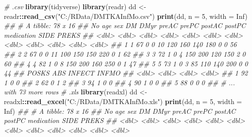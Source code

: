 \documentclass[
]{book}
\newenvironment{Shaded}{\begin{snugshade}}{\end{snugshade}}
\newcommand{\CommentTok}[1]{\textcolor[rgb]{0.56,0.35,0.01}{\textit{#1}}}
\newcommand{\DataTypeTok}[1]{\textcolor[rgb]{0.13,0.29,0.53}{#1}}
\newcommand{\DecValTok}[1]{\textcolor[rgb]{0.00,0.00,0.81}{#1}}
\newcommand{\KeywordTok}[1]{\textcolor[rgb]{0.13,0.29,0.53}{\textbf{#1}}}
\newcommand{\NormalTok}[1]{#1}
\newcommand{\OperatorTok}[1]{\textcolor[rgb]{0.81,0.36,0.00}{\textbf{#1}}}
\newcommand{\OtherTok}[1]{\textcolor[rgb]{0.56,0.35,0.01}{#1}}
\newcommand{\StringTok}[1]{\textcolor[rgb]{0.31,0.60,0.02}{#1}}
\begin{document}
\begin{Shaded}
\begin{Highlighting}[]
\CommentTok{\# .csv}
\KeywordTok{library}\NormalTok{(tidyverse)}
\KeywordTok{library}\NormalTok{(readr)}
\NormalTok{dd \textless{}{-}}\StringTok{ }\NormalTok{readr}\OperatorTok{::}\KeywordTok{read\_csv}\NormalTok{(}\StringTok{"C:/RData/DMTKAInfMo.csv"}\NormalTok{)}
\KeywordTok{print}\NormalTok{(dd, }\DataTypeTok{n =} \DecValTok{5}\NormalTok{, }\DataTypeTok{width =} \OtherTok{Inf}\NormalTok{)}
\CommentTok{\#\# \# A tibble: 78 x 16}
\CommentTok{\#\#      No   age   sex    DM  DMyr preAC prePC postAC postPC medication  SIDE PREKS}
\CommentTok{\#\#   \textless{}dbl\textgreater{} \textless{}dbl\textgreater{} \textless{}dbl\textgreater{} \textless{}dbl\textgreater{} \textless{}dbl\textgreater{} \textless{}dbl\textgreater{} \textless{}dbl\textgreater{}  \textless{}dbl\textgreater{}  \textless{}dbl\textgreater{}      \textless{}dbl\textgreater{} \textless{}dbl\textgreater{} \textless{}dbl\textgreater{}}
\CommentTok{\#\# 1     1    67     0     0    10   120   160    140    180          0     0    56}
\CommentTok{\#\# 2     2    67     0     0    11   100   150    150    220          0     1    62}
\CommentTok{\#\# 3     3    72     1     0     4   150   200    120    150          2     0    60}
\CommentTok{\#\# 4     4    82     1     0     8   150   200    160    250          0     1    47}
\CommentTok{\#\# 5     5    73     1     0     3    85   110    140    200          0     0    44}
\CommentTok{\#\#   POSKS   ABS INFECT INFMO}
\CommentTok{\#\#   \textless{}dbl\textgreater{} \textless{}dbl\textgreater{}  \textless{}dbl\textgreater{} \textless{}dbl\textgreater{}}
\CommentTok{\#\# 1    92     1      0     0}
\CommentTok{\#\# 2    62     0      1     2}
\CommentTok{\#\# 3    94     1      0     0}
\CommentTok{\#\# 4    90     1      0     0}
\CommentTok{\#\# 5    88     0      0     0}
\CommentTok{\#\# \# ... with 73 more rows}
\CommentTok{\# .xls}
\KeywordTok{library}\NormalTok{(readxl)}
\NormalTok{dd \textless{}{-}}\StringTok{ }\NormalTok{readxl}\OperatorTok{::}\KeywordTok{read\_excel}\NormalTok{(}\StringTok{"C:/RData/DMTKAInfMo.xls"}\NormalTok{)}
\KeywordTok{print}\NormalTok{(dd, }\DataTypeTok{n =} \DecValTok{5}\NormalTok{, }\DataTypeTok{width =} \OtherTok{Inf}\NormalTok{)}
\CommentTok{\#\# \# A tibble: 78 x 16}
\CommentTok{\#\#      No   age   sex    DM  DMyr preAC prePC postAC postPC medication  SIDE PREKS}
\CommentTok{\#\#   \textless{}dbl\textgreater{} \textless{}dbl\textgreater{} \textless{}dbl\textgreater{} \textless{}dbl\textgreater{} \textless{}dbl\textgreater{} \textless{}dbl\textgreater{} \textless{}dbl\textgreater{}  \textless{}dbl\textgreater{}  \textless{}dbl\textgreater{}      \textless{}dbl\textgreater{} \textless{}dbl\textgreater{} \textless{}dbl\textgreater{}}

\end{Highlighting}
\end{Shaded}
\end{document}
